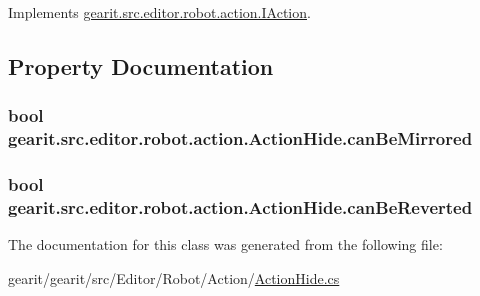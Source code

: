 Implements \hyperlink{interfacegearit_1_1src_1_1editor_1_1robot_1_1action_1_1_i_action_a8a84360c15fcd7d0f60ff7aef2dca980}{gearit.\+src.\+editor.\+robot.\+action.\+I\+Action}.



\subsection{Property Documentation}
\hypertarget{classgearit_1_1src_1_1editor_1_1robot_1_1action_1_1_action_hide_a6378c63aab9d4f2a1aa6e62f5367baf9}{
\subsubsection[{can\+Be\+Mirrored}]{\setlength{\rightskip}{0pt plus 5cm}bool gearit.\+src.\+editor.\+robot.\+action.\+Action\+Hide.\+can\+Be\+Mirrored\hspace{0.3cm}{\ttfamily [get]}}}\label{classgearit_1_1src_1_1editor_1_1robot_1_1action_1_1_action_hide_a6378c63aab9d4f2a1aa6e62f5367baf9}
\hypertarget{classgearit_1_1src_1_1editor_1_1robot_1_1action_1_1_action_hide_a93308ff36d895e506b394e2d7ad949c2}{
\subsubsection[{can\+Be\+Reverted}]{\setlength{\rightskip}{0pt plus 5cm}bool gearit.\+src.\+editor.\+robot.\+action.\+Action\+Hide.\+can\+Be\+Reverted\hspace{0.3cm}{\ttfamily [get]}}}\label{classgearit_1_1src_1_1editor_1_1robot_1_1action_1_1_action_hide_a93308ff36d895e506b394e2d7ad949c2}


The documentation for this class was generated from the following file\+:\begin{DoxyCompactItemize}
\item 
gearit/gearit/src/\+Editor/\+Robot/\+Action/\hyperlink{_action_hide_8cs}{Action\+Hide.\+cs}\end{DoxyCompactItemize}
